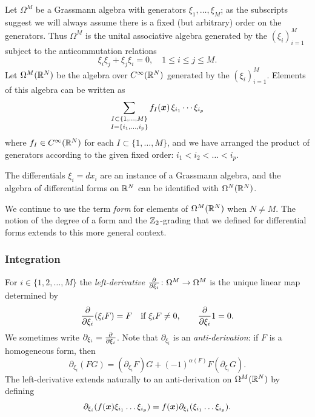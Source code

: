 \documentclass[11pt,a4paper]{article}
\begin{document}
Let $\Omega^M$ be a Grassmann algebra with generators
$\xi_1, \dots, \xi_M$; as the subscripts suggest we will
always assume there is a fixed (but arbitrary) order on the
generators. Thus $\Omega^M$ is the unital associative algebra
generated by the $(\xi_i)_{i=1}^{M}$ subject to the anticommutation
relations
\begin{equation}
  \xi_i \xi_j + \xi_j\xi_i = 0, \quad 1\leq i\leq j\leq M.
\end{equation}
Let $\Omega^M(\mathbb{R}^N)$ be the algebra over $C^{\infty}(\mathbb{R}^{N})$
generated by the $(\xi_{i})_{i=1}^{M}$. Elements of this algebra can
be written as
\begin{equation}
  \label{eq:b-gf}
  \mathop{\sum_{I\subset \{1,\dots,M\}}}_{I = \{i_{1},\dots, i_{p}\}}
  f_{I}(\boldsymbol{x}) \, \xi_{i_{1}}\cdots\xi_{i_{p}} 
\end{equation}
where $f_{I}\in C^{\infty}(\mathbb{R}^{N})$ for each
$I\subset \{1,\dots, M\}$, and we have arranged the product of
generators according to the given fixed order:
$i_{1}<i_{2}<\dots <i_{p}$.

\begin{example}
  The differentials $\xi_{i} = dx_i$
  are an instance of a Grassmann algebra, and the algebra of
  differential forms on $\mathbb{R}^N$ can be identified with $\Omega^N(\mathbb{R}^N)$.
\end{example}

We continue to use the term \emph{form} for elements of
$\Omega^M(\mathbb{R}^N)$ when $N\neq M$.  The notion of the degree of a form
and the $\mathbb{Z}_{2}$-grading that we defined for differential forms
extends to this more general context.

\subsubsection{Integration}
\label{sec:integration-forms}

For $i\in \{1,2,\dots, M\}$ the\emph{ left-derivative} $\frac{\partial }{\partial \xi_i}\colon \Omega^M \to \Omega^M$
is the unique linear map determined by
\begin{equation}
  \frac{\partial }{\partial \xi_i} (\xi_iF) = F \quad \text{if $\xi_i F \neq 0$}, \qquad \frac{\partial }{\partial \xi_i} 1 = 0.
\end{equation}
We sometimes write $\partial_{\xi_i} = \frac{\partial }{\partial \xi_{i}}$. Note that
$\partial_{\xi_i}$ is an \emph{anti-derivation}: if $F$ is a
homogeneous form, then
\begin{equation}
  \partial_{\xi_i} (FG) = (\partial_{\xi_i}F)G + (-1)^{\alpha(F)} F (\partial_{\xi_i}G).
\end{equation}
The left-derivative extends naturally to an anti-derivation on
$\Omega^M(\mathbb{R}^N)$ by defining
\begin{equation}
\partial_{\xi_{i}} ( f(\boldsymbol{x})\xi_{i_{1}}\dots \xi_{i_{p}})
= f(\boldsymbol{x}) \partial_{\xi_{i}} (\xi_{i_{1}}\dots \xi_{i_{p}}).
\end{equation}
\end{document}
